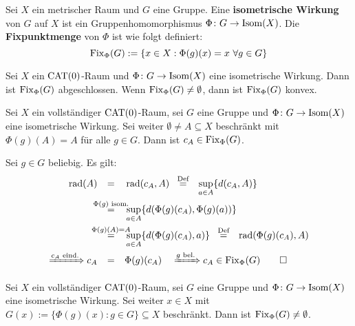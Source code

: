 \begin{definition}
\label{def:1.25}
	Sei $X$ ein metrischer Raum und $G$ eine Gruppe.
	Eine \textbf{isometrische Wirkung} von $G$ auf $X$ ist ein Gruppenhomomorphismus $\Phi \colon G \rightarrow \operatorname{Isom}(X)$. 
	Die \textbf{Fixpunktmenge} von $\Phi$ ist wie folgt definiert: 
	\[
		\operatorname{Fix}_\Phi(G) := \{x \in X : \Phi(g)(x) = x \ \forall g \in G\}
	\]
\end{definition}

\begin{lemma}
\label{lemma:1.26}
	Sei $X$ ein $\operatorname{CAT(0)}$-Raum und $\Phi\colon G \rightarrow \operatorname{Isom}(X)$ eine isometrische Wirkung.
	Dann ist $\operatorname{Fix}_\Phi(G)$ abgeschlossen. 
	Wenn $\operatorname{Fix}_\Phi(G) \neq \emptyset$, dann ist $\operatorname{Fix}_\Phi(G)$ konvex. 
\end{lemma}

\begin{satz}
\label{satz:1.27} \label{BTFT}
	Sei $X$ ein vollständiger $\operatorname{CAT(0)}$-Raum, sei $G$ eine Gruppe und $\Phi\colon G \rightarrow \operatorname{Isom}(X)$ eine isometrische Wirkung.  
	Sei weiter $\emptyset \neq A \subseteq X$ beschränkt mit $\Phi(g)(A) = A$ für alle $g \in G$.
	Dann ist $c_A \in \operatorname{Fix}_\Phi(G)$.
\end{satz}

\begin{beweis}
	Sei $g \in G$ beliebig.
	Es gilt:
	\begin{align*}
		\rad(A) &\stack{}{=} \rad(c_A,A) \stack{\text{Def}}{=} \sup_{a \in A}\{ d(c_A,A)\} \\
		&\stack{\Phi(g) \text{ isom.}}{=} \sup_{a \in A} \{d(\Phi(g)(c_A),\Phi(g)(a))\} \\
		&\stack{\Phi(g)(A)=A}{=} \sup_{a \in A} \{d(\Phi(g)(c_A),a)\} \stack{\text{Def}}{=} \rad(\Phi(g)(c_A),A) \\
		\xRightarrow{c_A \text{ eind.}} c_A &\stack{}{=} \Phi(g)(c_A) \quad \xRightarrow{g \text{ bel.}} c_A \in \Fix_\Phi(G) \qedhere
	\end{align*}
\end{beweis}

\begin{korollar}
\label{kor:1.28}
	Sei $X$ ein vollständiger $\operatorname{CAT(0)}$-Raum, sei $G$ eine Gruppe und $\Phi\colon G \rightarrow \operatorname{Isom}(X)$ eine isometrische Wirkung.
	Sei weiter $x \in X$ mit $G(x) := \{\Phi(g)(x) : g \in G\} \subseteq X$ beschränkt.
	Dann ist $\operatorname{Fix}_\Phi(G) \neq \emptyset$.
\end{korollar}

